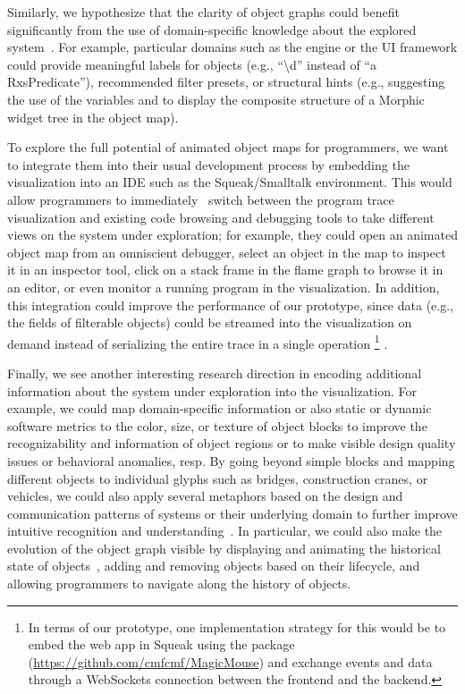 Similarly, we hypothesize that the clarity of object graphs could benefit significantly from the use of domain-specific knowledge about the explored system~\cite{chis2014moldable}.
For example, particular domains such as the  engine or the  UI framework could provide meaningful labels for objects (e.g., ``\textbackslash{}d'' instead of ``a RxsPredicate''), recommended filter presets, or structural hints (e.g., suggesting the use of the variables  and  to display the composite structure of a Morphic widget tree in the object map).

To explore the full potential of animated object maps for programmers, we want to integrate them into their usual development process by embedding the visualization into an IDE such as the Squeak/Smalltalk environment.
This would allow programmers to immediately~\cite{ungar1997debugging} switch between the program trace visualization and existing code browsing and debugging tools to take different views on the system under exploration; for example, they could open an animated object map from an omniscient debugger, select an object in the map to inspect it in an inspector tool, click on a stack frame in the flame graph to browse it in an editor, or even monitor a running program in the visualization.
In addition, this integration could improve the performance of our prototype, since data (e.g., the fields of filterable objects) could be streamed into the visualization on demand instead of serializing the entire trace in a single operation%
\footnote{In terms of our \tfd{} prototype, one implementation strategy for this would be to embed the web app in Squeak using the  package (\url{https://github.com/cmfcmf/MagicMouse}) and exchange events and data through a WebSockets connection between the frontend and the backend.}%
.

Finally, we see another interesting research direction in encoding additional information about the system under exploration into the visualization.
For example, we could map domain-specific information or also static or dynamic software metrics to the color, size, or texture of object blocks to improve the recognizability and information of object regions or to make visible design quality issues or behavioral anomalies, resp.
By going beyond simple blocks and mapping different objects to individual glyphs such as bridges, construction cranes, or vehicles, we could also apply several metaphors based on the design and communication patterns of systems or their underlying domain to further improve intuitive recognition and understanding~\cite{cheng2008xdiva,wurfel2015natural}.
In particular, we could also make the evolution of the object graph visible by displaying and animating the historical state of objects~\cite{thiede2023object,thiede2023time}, adding and removing objects based on their lifecycle, and allowing programmers to navigate along the history of objects.
